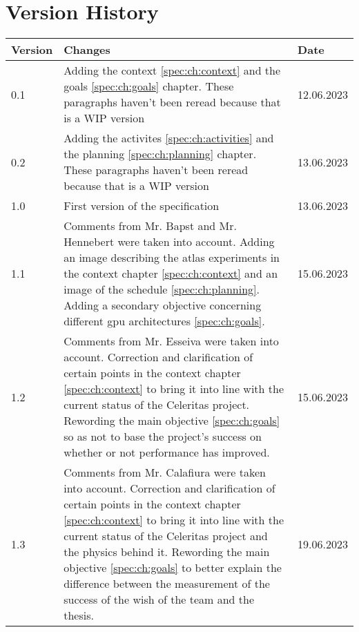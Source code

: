 \chapter{Version History}
\label{chap:spec-versions}

\begin{tabular}{|m{}|m{}|m{}|}
 \hline
 \textbf{Version} & \textbf{Changes} & \textbf{Date} \\ [0.5ex]
 \hline
 0.1 & Adding the context \ref{spec:ch:context} and the goals \ref{spec:ch:goals} chapter. These paragraphs haven't been reread because that is a WIP version & 12.06.2023  \\
 \hline
 0.2 & Adding the activites \ref{spec:ch:activities} and the planning \ref{spec:ch:planning} chapter. These paragraphs haven't been reread because that is a WIP version & 13.06.2023  \\
 \hline
 1.0 & First version of the specification & 13.06.2023  \\
 \hline
 1.1 &
 Comments from Mr. Bapst and Mr. Hennebert were taken into account.
 Adding an image describing the \acrshort{atlas} experiments in the context chapter \ref{spec:ch:context} and an image of the schedule \ref{spec:ch:planning}.
 Adding a secondary objective concerning different \acrshort{gpu} architectures \ref{spec:ch:goals}.
 & 15.06.2023  \\
 \hline
 1.2 &
 Comments from Mr. Esseiva were taken into account.
 Correction and clarification of certain points in the context chapter \ref{spec:ch:context} to bring it into line with the current status of the Celeritas project.
 Rewording the main objective \ref{spec:ch:goals} so as not to base the project's success on whether or not performance has improved.
 & 15.06.2023  \\
 \hline
 1.3 &
 Comments from Mr. Calafiura were taken into account.
 Correction and clarification of certain points in the context chapter \ref{spec:ch:context} to bring it into line with the current status of the Celeritas project and the physics behind it.
 Rewording the main objective \ref{spec:ch:goals} to better explain the difference between the measurement of the success of the wish of the team and the thesis.
 & 19.06.2023  \\
 \hline
\end{tabular}
